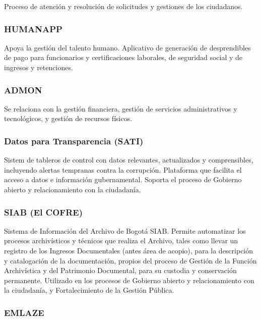 \documentclass[
	a4paper, %
	12pt, %
]{include/CSSullivanBusinessReport}
\begin{document}
Proceso de atención y resolución de solicitudes y gestiones de los
ciudadanos.

\subsubsection{HUMANAPP}\label{sec:humanapp}

Apoya la gestión del talento humano. Aplicativo de generación de
desprendibles de pago para funcionarios y certificaciones laborales, de
seguridad social y de ingresos y retenciones.

\subsubsection{ADMON}\label{sec:admon}

Se relaciona con la gestión financiera, gestión de servicios
administrativos y tecnológicos, y gestión de recursos físicos.

\subsubsection{Datos para Transparencia
(SATI)}\label{sec:datos-para-transparencia-sati}

Sistem de tableros de control con datos relevantes, actualizados y
comprensibles, incluyendo alertas tempranas contra la corrupción.
Plataforma que facilita el acceso a datos e información gubernamental.
Soporta el proceso de Gobierno abierto y relacionamiento con la
ciudadanía.

\subsubsection{SIAB (El COFRE)}\label{sec:siab-el-cofre}

Sistema de Información del Archivo de Bogotá SIAB. Permite automatizar
los procesos archivísticos y técnicos que realiza el Archivo, tales como
llevar un registro de los Ingresos Documentales (antes área de acopio),
para la descripción y catalogación de la documentación, propios del
proceso de Gestión de la Función Archivística y del Patrimonio
Documental, para su custodia y conservación permanente. Utilizado en los
procesos de Gobierno abierto y relacionamiento con la ciudadanía, y
Fortalecimiento de la Gestión Pública.

\subsubsection{EMLAZE}\label{sec:emlaze}
\end{document}
